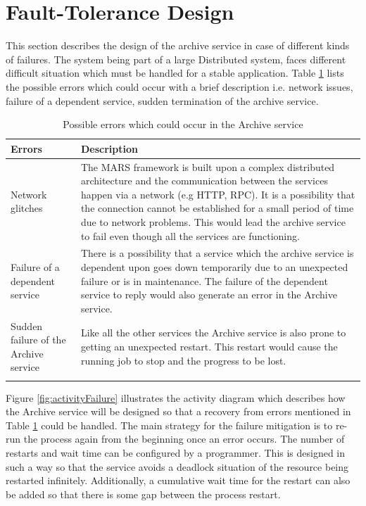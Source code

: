 \newpage
\section{Fault-Tolerance Design}
\label{sec:ftDesign}
This section describes the design of the archive service in case of different kinds of failures. The system being part of a large Distributed system,
faces different difficult situation which must be handled for a stable application. Table \ref{table:probServices} lists the possible errors which 
could occur with a brief description i.e. network issues, failure of a 
dependent service, sudden termination of the archive service. 
\begin{longtable}{|p{4cm}|p{10cm}|}
    \hline
        \textbf{Errors}  & \textbf{Description}\\
    \hline
        Network glitches & The MARS framework is built upon a complex distributed architecture and the communication between the services
        happen via a network (e.g HTTP, RPC). It is a possibility that the connection cannot be established for a small period of time due to network problems.
        This would lead the archive service to fail even though all the services are functioning.\\
    \hline
        Failure of a dependent service & There is a possibility that a service which the archive service is dependent upon goes down temporarily due to an unexpected
        failure or is in maintenance. The failure of the dependent service to reply would also generate an error in the Archive service.\\
    \hline
        Sudden failure of the Archive service & Like all the other services the Archive service is also prone to getting an unexpected restart. This restart would cause
        the running job to stop and the progress to be lost.\\    
    \hline
    \caption{Possible errors which could occur in the Archive service}
    \label{table:probServices} 
\end{longtable}

Figure \ref{fig:activityFailure} illustrates the activity diagram which describes how the Archive service will be designed so that a recovery from errors mentioned in
Table \ref{table:probServices} could be handled. The main strategy for the failure mitigation is to re-run the process again from the beginning once an error occurs. 
The number of restarts and wait time can be configured by a programmer. This is designed in such a way so that the service avoids a deadlock situation of the
resource being restarted infinitely. Additionally, a cumulative wait time for the restart can also be added so that there is some gap between the process restart.

